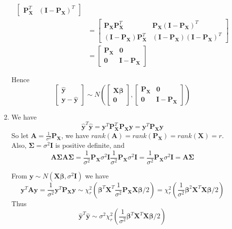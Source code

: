 \documentclass{article}
\begin{document}
\begin{enumerate}[leftmargin = 0 em, label = \arabic*., font = \bfseries]
\begin{enumerate}
\begin{align*}
\begin{bmatrix}
			\bm P_{\bm X}^T & (\bm I - \bm P_{\bm X})^T
		\end{bmatrix}\\
		& = \begin{bmatrix}
			\bm P_{\bm X} \bm P_{\bm X}^T & \bm P_{\bm X} (\bm I - \bm P_{\bm X})^T\\
			(\bm I - \bm P_{\bm X}) \bm P_{\bm X}^T & (\bm I - \bm P_{\bm X})(\bm I - \bm P_{\bm X})^T
		\end{bmatrix} \\
		& = \begin{bmatrix}
			\bm P_{\bm X} & \bm 0\\
			\bm 0 & \bm I - \bm P_{\bm X}
		\end{bmatrix}
		\end{align*}

		Hence 
		\[\begin{bmatrix}
			\hat{\bm y}\\
			\bm y - \hat{\bm y}
		\end{bmatrix} \sim N\left(\begin{bmatrix}
			\bm X \bm \beta\\
			\bm 0
		\end{bmatrix} , \begin{bmatrix}
			\bm P_{\bm X} & \bm 0\\
			\bm 0 & \bm I - \bm P_{\bm X}
		\end{bmatrix}\right)\]

		\item 
		We have
		\[\hat{\bm y}^T \hat{\bm y} = \bm y^T \bm P_{\bm X}^T \bm P_{\bm X}\bm y = \bm y^T \bm P_{\bm X} \bm y\]
		So let $\bm A = \frac{1}{\sigma^2} \bm P_{\bm X}$, we have $rank(\bm A) = rank(\bm P_{\bm X}) = rank(\bm X) = r$. Also, $\bm \Sigma = \sigma^2 \bm I$ is positive definite, and 
		\[\bm A \bm \Sigma \bm A \bm \Sigma = \frac{1}{\sigma^2} \bm P_{\bm X} \sigma^2 \bm I \frac{1}{\sigma^2} \bm P_{\bm X} \sigma^2 \bm I = \frac{1}{\sigma^2}\bm P_{\bm X} \sigma^2 \bm I = \bm A \bm \Sigma \]

		From $\bm y \sim N(\bm X \bm \beta , \sigma^2 \bm I)$ we have
		\[\bm y ^T \bm A \bm y = \frac{1}{\sigma^2} \bm y^T \bm P_{\bm X} \bm y \sim \chi_r^2 \left(\bm \beta^T \bm X^T \frac{1}{\sigma^2} \bm P_{\bm X} \bm X \bm \beta / 2\right) = \chi_r^2 \left(\frac{1}{\sigma^2} \bm \beta^2 \bm X^T \bm X \bm \beta / 2\right)\]
		Thus
		\[\hat{\bm y}^T \hat{\bm y} \sim \sigma^2 \chi_r^2 \left(\frac{1}{\sigma^2} \bm \beta^T \bm X^T \bm X \bm \beta / 2\right)\]
		
	\end{enumerate}


\end{enumerate}
\end{document}

